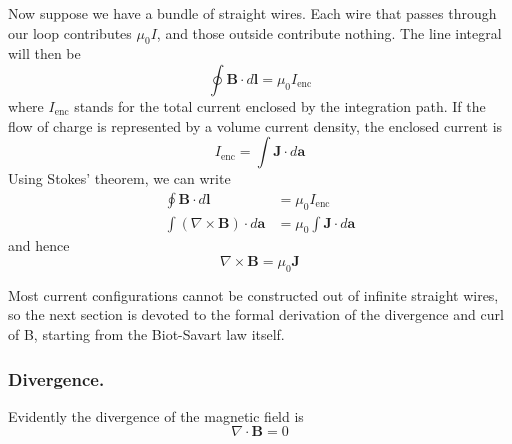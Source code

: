 \documentclass[../../../main.tex]{subfiles}
\begin{document}
Now suppose we have a bundle of straight wires. Each wire that passes through our loop contributes $\mu_0 I$, and those outside contribute nothing. The line integral will then be
\begin{equation*}
    \oint \mathbf{B}\cdot d\mathbf{l}=\mu_0I_{\text{enc}}
\end{equation*}
where $I_{\text{enc}}$ stands for the total current enclosed by the integration path. If the ﬂow
of charge is represented by a volume current density, the enclosed current is
\begin{equation*}
    I_{\text{enc}}=\int \mathbf{J}\cdot d\mathbf{a}
\end{equation*}
Using Stokes' theorem, we can write
\begin{align*}
    \oint \mathbf{B}\cdot d\mathbf{l}               & =\mu_0I_{\text{enc}}                   \\
    \int(\nabla \times \mathbf{B})\cdot d\mathbf{a} & =\mu_0\int \mathbf{J}\cdot d\mathbf{a}
\end{align*}
and hence
\begin{equation*}
    \nabla \times \mathbf{B}=\mu_0\mathbf{J}
\end{equation*}

Most current configurations cannot be constructed out of infinite straight wires, so the next section is devoted to the formal derivation of the divergence and curl of B, starting from the Biot-Savart law itself.

\subsubsection{Divergence.} Evidently the divergence of the magnetic field is
\begin{equation*}
    \nabla \cdot \mathbf{B}=0
\end{equation*}
\end{document}
